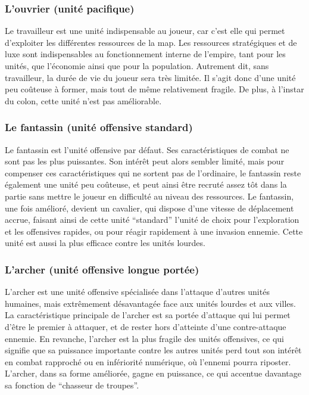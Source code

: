 \documentclass[12pt]{report}
\begin{document}
\subsubsection{L'ouvrier (unité pacifique)}

Le travailleur est une unité indispensable au joueur, car c’est elle qui permet
d’exploiter les différentes ressources de la map. Les ressources stratégiques et
de luxe sont indispensables au fonctionnement interne de l’empire, tant pour les
unités, que l'économie ainsi que pour la population. Autrement dit, sans
travailleur, la durée de vie du joueur sera très limitée. Il s’agit donc d’une
unité peu coûteuse à former, mais tout de même relativement fragile. De plus, à
l’instar du colon, cette unité n’est pas améliorable.

\subsubsection{Le fantassin (unité offensive standard)}

Le fantassin est l’unité offensive par défaut. Ses caractéristiques de combat ne
sont pas les plus puissantes. Son intérêt peut alors sembler limité, mais pour
compenser ces caractéristiques qui ne sortent pas de l’ordinaire, le fantassin
reste également une unité peu coûteuse, et peut ainsi être recruté assez tôt
dans la partie sans mettre le joueur en difficulté au niveau des ressources. Le
fantassin, une fois amélioré, devient un cavalier, qui dispose d’une vitesse de
déplacement accrue, faisant ainsi de cette unité “standard” l’unité de choix
pour l’exploration et les offensives rapides, ou pour réagir rapidement à une
invasion ennemie. Cette unité est aussi la plus efficace contre les unités
lourdes.

\subsubsection{L'archer (unité offensive longue portée)}

L’archer est une unité offensive spécialisée dans l’attaque d’autres unités
humaines, mais extrêmement désavantagée face aux unités lourdes et aux villes.
La caractéristique principale de l’archer est sa portée d’attaque qui lui permet
d’être le premier à attaquer, et de rester hors d’atteinte d’une contre-attaque
ennemie. En revanche, l’archer est la plus fragile des unités offensives, ce qui
signifie que sa puissance importante contre les autres unités perd tout son
intérêt en combat rapproché ou en infériorité numérique, où l’ennemi pourra
riposter. L’archer, dans sa forme améliorée, gagne en puissance, ce qui accentue
davantage sa fonction de “chasseur de troupes”.
\end{document}
